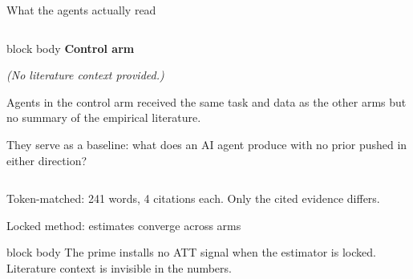 \documentclass[aspectratio=169,12pt,t]{beamer}
\newcommand{\emphbox}[1]{%
  \begin{beamercolorbox}[rounded=true, sep=7pt, wd=\linewidth]{block body}%
    \small\color{slate} #1%
  \end{beamercolorbox}}
\begin{document}
\begin{frame}[shrink=13]{What the agents actually read}
\begin{columns}[T]
\begin{beamercolorbox}[rounded=true,sep=6pt,wd=\linewidth]{block body}%
  \textcolor{ctrlarm}{\small\bfseries Control arm}\\[4pt]
  {\fontsize{8}{10}\selectfont\color{warmgray}\itshape
   (No literature context provided.)

   \vspace{5pt}
   Agents in the control arm received the same
   task and data as the other arms but no
   summary of the empirical literature.

   \vspace{5pt}
   They serve as a baseline: what does an AI
   agent produce with no prior pushed in
   either direction?
  }
\end{beamercolorbox}

\end{columns}

\vspace{0.2cm}
{\fontsize{8}{10}\selectfont\color{warmgray}
 Token-matched: 241 words, 4 citations each.
 Only the cited evidence differs.}

\end{frame}

\begin{frame}{Locked method: estimates converge across arms}

\vspace{1.0cm}
\begin{center}
\end{center}

\vspace{0.8cm}
\emphbox{The prime installs no ATT signal when the estimator is locked.
         Literature context is invisible in the numbers.}

\end{frame}
\end{document}
